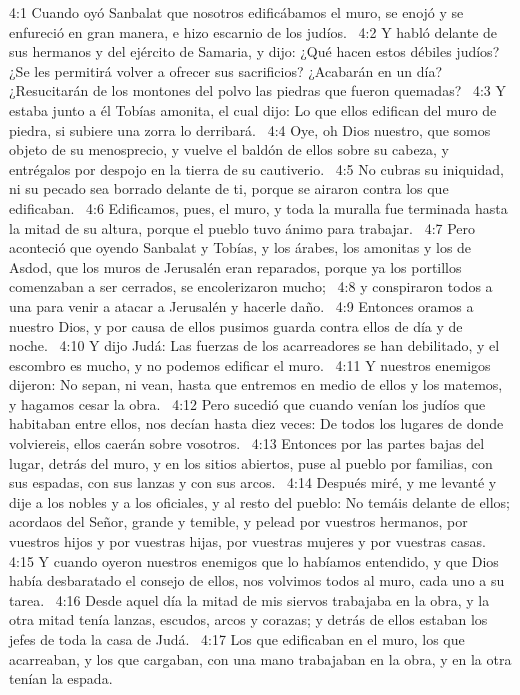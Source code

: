 4:1 Cuando oyó Sanbalat que nosotros edificábamos el muro, se enojó y se enfureció en gran manera, e hizo escarnio de los judíos.  
4:2 Y habló delante de sus hermanos y del ejército de Samaria, y dijo: ¿Qué hacen estos débiles judíos? ¿Se les permitirá volver a ofrecer sus sacrificios? ¿Acabarán en un día? ¿Resucitarán de los montones del polvo las piedras que fueron quemadas?  
4:3 Y estaba junto a él Tobías amonita, el cual dijo: Lo que ellos edifican del muro de piedra, si subiere una zorra lo derribará.  
4:4 Oye, oh Dios nuestro, que somos objeto de su menosprecio, y vuelve el baldón de ellos sobre su cabeza, y entrégalos por despojo en la tierra de su cautiverio.  
4:5 No cubras su iniquidad, ni su pecado sea borrado delante de ti, porque se airaron contra los que edificaban.  
4:6 Edificamos, pues, el muro, y toda la muralla fue terminada hasta la mitad de su altura, porque el pueblo tuvo ánimo para trabajar.  
4:7 Pero aconteció que oyendo Sanbalat y Tobías, y los árabes, los amonitas y los de Asdod, que los muros de Jerusalén eran reparados, porque ya los portillos comenzaban a ser cerrados, se encolerizaron mucho;  
4:8 y conspiraron todos a una para venir a atacar a Jerusalén y hacerle daño.  
4:9 Entonces oramos a nuestro Dios, y por causa de ellos pusimos guarda contra ellos de día y de noche.  
4:10 Y dijo Judá: Las fuerzas de los acarreadores se han debilitado, y el escombro es mucho, y no podemos edificar el muro.  
4:11 Y nuestros enemigos dijeron: No sepan, ni vean, hasta que entremos en medio de ellos y los matemos, y hagamos cesar la obra.  
4:12 Pero sucedió que cuando venían los judíos que habitaban entre ellos, nos decían hasta diez veces: De todos los lugares de donde volviereis, ellos caerán sobre vosotros.  
4:13 Entonces por las partes bajas del lugar, detrás del muro, y en los sitios abiertos, puse al pueblo por familias, con sus espadas, con sus lanzas y con sus arcos.  
4:14 Después miré, y me levanté y dije a los nobles y a los oficiales, y al resto del pueblo: No temáis delante de ellos; acordaos del Señor, grande y temible, y pelead por vuestros hermanos, por vuestros hijos y por vuestras hijas, por vuestras mujeres y por vuestras casas.  
4:15 Y cuando oyeron nuestros enemigos que lo habíamos entendido, y que Dios había desbaratado el consejo de ellos, nos volvimos todos al muro, cada uno a su tarea.  
4:16 Desde aquel día la mitad de mis siervos trabajaba en la obra, y la otra mitad tenía lanzas, escudos, arcos y corazas; y detrás de ellos estaban los jefes de toda la casa de Judá.  
4:17 Los que edificaban en el muro, los que acarreaban, y los que cargaban, con una mano trabajaban en la obra, y en la otra tenían la espada.  

